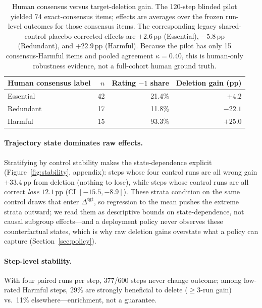 \documentclass[11pt]{article}
\newcommand{\ci}[2]{[#1, #2]}
\begin{document}
\begin{table}[t]
\centering
\scriptsize
\setlength{\tabcolsep}{4pt}
\begin{tabular}{@{}lrrr@{}}
\toprule
Human consensus label & $n$ & Rating $-1$ share & Deletion gain (pp) \\
\midrule
Essential  & 42 & 21.4\% & $+4.2$ \\
Redundant  & 17 & 11.8\% & $-22.1$ \\
Harmful    & 15 & 93.3\% & $+25.0$ \\
\bottomrule
\end{tabular}
\caption{Human consensus versus target-deletion gain. The 120-step blinded pilot yielded 74 exact-consensus items; effects are averages over the frozen run-level outcomes for those consensus items. The corresponding legacy shared-control placebo-corrected effects are $+2.6$\,pp (Essential), $-5.8$\,pp (Redundant), and $+22.9$\,pp (Harmful). Because the pilot has only 15 consensus-Harmful items and pooled agreement $\kappa=0.40$, this is human-only robustness evidence, not a full-cohort human ground truth.}
\label{tab:humanpilot}
\end{table}

\paragraph{Trajectory state dominates raw effects.}
Stratifying by control stability makes the state-dependence explicit (Figure~\ref{fig:stability}, appendix): steps whose four control runs are all wrong gain $+33.4$\,pp from deletion (nothing to lose), while steps whose control runs are all correct \emph{lose} $12.1$\,pp (CI $\ci{-15.5}{-8.9}$). These strata condition on the same control draws that enter $\Delta^{\mathrm{tgt}}$, so regression to the mean pushes the extreme strata outward; we read them as descriptive bounds on state-dependence, not causal subgroup effects---and a deployment policy never observes these counterfactual states, which is why raw deletion gains overstate what a policy can capture (Section~\ref{sec:policy}).

\paragraph{Step-level stability.}
With four paired runs per step, 377/600 steps never change outcome; among low-rated Harmful steps, 29\% are strongly beneficial to delete ($\ge 3$-run gain) vs.\ 11\% elsewhere---enrichment, not a guarantee.
\end{document}
